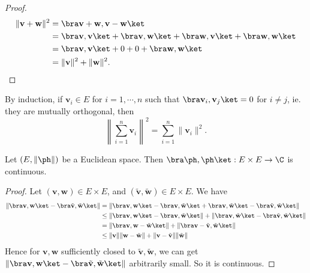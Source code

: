 \documentclass[a4paper]{article}
\begin{document}
\begin{proof}
  \begin{align*}
    \|\mathbf{v} + \mathbf{w}\|^2 &= \bra \mathbf{v} + \mathbf{w}, \mathbf{v} - \mathbf{w}\ket\\
    &= \bra \mathbf{v}, \mathbf{v}\ket + \bra \mathbf{v}, \mathbf{w}\ket + \bra \mathbf{w}, \mathbf{v} \ket + \bra \mathbf{w}, \mathbf{w}\ket\\
    &= \bra \mathbf{v}, \mathbf{v}\ket + 0 + 0 + \bra \mathbf{w}, \mathbf{w}\ket\\
    &= \|\mathbf{v}\|^2 + \|\mathbf{w}\|^2.
  \end{align*}
\end{proof}
By induction, if $\mathbf{v}_i \in E$ for $i = 1,\cdots, n$ such that $\bra \mathbf{v}_i, \mathbf{v}_j\ket = 0$ for $i \not= j$, ie. they are mutually orthogonal, then
\[
  \left\|\sum_{i = 1}^n \mathbf{v}_i\right\|^2 = \sum_{i = 1}^n \|\mathbf{v}_i\|^2.
\]
\begin{prop}
  Let $(E, \|\ph\|)$ be a Euclidean space. Then $\bra \ph, \ph\ket: E \times E \to \C$ is continuous.
\end{prop}

\begin{proof}
  Let $(\mathbf{v}, \mathbf{w}) \in E\times E$, and $(\tilde{\mathbf{v}}, \tilde{\mathbf{w}}) \in E\times E$. We have
  \begin{align*}
    \|\bra \mathbf{v}, \mathbf{w}\ket - \bra \tilde{\mathbf{v}}, \tilde{\mathbf{w}}\ket\| &= \|\bra \mathbf{v}, \mathbf{w}\ket - \bra \mathbf{v}, \tilde{\mathbf{w}}\ket + \bra \mathbf{v}, \tilde{\mathbf{w}}\ket - \bra \tilde{\mathbf{v}}, \tilde{\mathbf{w}}\ket\|\\
    &\leq \|\bra \mathbf{v}, \mathbf{w}\ket - \bra \mathbf{v}, \tilde{\mathbf{w}}\ket\| + \|\bra \mathbf{v}, \tilde{\mathbf{w}}\ket - \bra \tilde{\mathbf{v}}, \tilde{\mathbf{w}}\ket\|\\
    &= \|\bra \mathbf{v}, \mathbf{w} - \tilde{\mathbf{w}}\ket \| + \|\bra \mathbf{v} - \tilde{\mathbf{v}}, \tilde{\mathbf{w}}\ket \|\\
    &\leq \|\mathbf{v}\| \|\mathbf{w} - \tilde{\mathbf{w}}\| + \|\mathbf{v} - \tilde{\mathbf{v}}\|\|\tilde{\mathbf{w}}\|
  \end{align*}
  Hence for $\mathbf{v}, \mathbf{w}$ sufficiently closed to $\tilde{\mathbf{v}}, \tilde{\mathbf{w}}$, we can get $\|\bra \mathbf{v}, \mathbf{w}\ket - \bra \tilde{\mathbf{v}}, \tilde{\mathbf{w}}\ket\|$ arbitrarily small. So it is continuous.
\end{proof}
\end{document}
